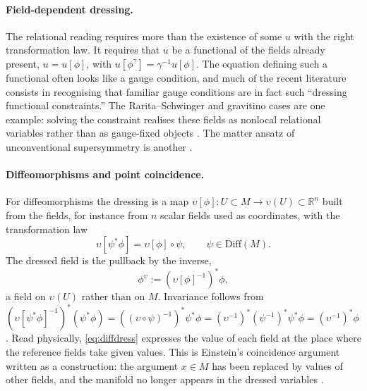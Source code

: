 \documentclass[11pt]{article}
\theoremstyle{plain}
\theoremstyle{definition}
\theoremstyle{remark}
\newcommand{\Diff}{\mathrm{Diff}}
\begin{document}
\paragraph{Field-dependent dressing.} The relational reading requires more than the existence of some $u$ with the right transformation law. It requires that $u$ be a functional of the fields already present, $u=u[\phi]$, with $u[\phi^\gamma]=\gamma^{-1}u[\phi]$. The equation defining such a functional often looks like a gauge condition, and much of the recent literature consists in recognising that familiar gauge conditions are in fact such ``dressing functional constraints.'' The Rarita--Schwinger and gravitino cases are one example: solving the constraint realises these fields as nonlocal relational variables rather than as gauge-fixed objects \cite{fr-rs}. The matter ansatz of unconventional supersymmetry is another \cite{fr-unconv}.

\paragraph{Diffeomorphisms and point coincidence.} For diffeomorphisms the dressing is a map $\upsilon[\phi]:U\subset M\to\upsilon(U)\subset\mathbb R^n$ built from the fields, for instance from $n$ scalar fields used as coordinates, with the transformation law
\begin{equation}
\upsilon[\psi^*\phi]=\upsilon[\phi]\circ\psi,\qquad \psi\in\Diff(M).
\end{equation}
The dressed field is the pullback by the inverse,
\begin{equation}\label{eq:diffdress}
\phi^\upsilon := (\upsilon[\phi]^{-1})^*\phi,
\end{equation}
a field on $\upsilon(U)$ rather than on $M$. Invariance follows from $(\upsilon[\psi^*\phi]^{-1})^*(\psi^*\phi)=((\upsilon\circ\psi)^{-1})^*\psi^*\phi=(\upsilon^{-1})^*(\psi^{-1})^*\psi^*\phi=(\upsilon^{-1})^*\phi$. Read physically, \eqref{eq:diffdress} expresses the value of each field at the place where the reference fields take given values. This is Einstein's coincidence argument written as a construction: the argument $x\in M$ has been replaced by values of other fields, and the manifold no longer appears in the dressed variables \cite{fr-diff,fr-grf}.
\end{document}

